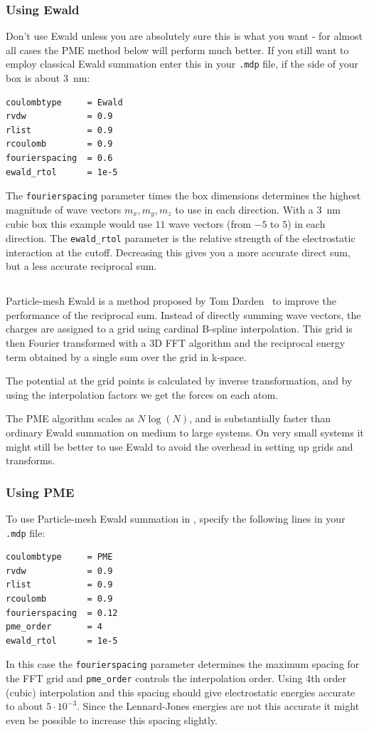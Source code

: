 \subsubsection{Using Ewald}
Don't use Ewald unless you are absolutely sure this is what you want -
for almost all cases the PME method below will perform much better.
If you still want to employ classical Ewald summation enter this in
your {\tt .mdp} file, if the side of your box is about $3$~nm:
\begin{verbatim}
coulombtype     = Ewald
rvdw            = 0.9
rlist           = 0.9
rcoulomb        = 0.9
fourierspacing  = 0.6
ewald_rtol      = 1e-5
\end{verbatim}
The {\tt fourierspacing} parameter times the box dimensions determines
the highest magnitude of wave vectors $m_x,m_y,m_z$ to use in each
direction. With a 3~nm cubic box this example would use $11$ wave vectors
(from $-5$ to $5$) in each direction.  The {\tt ewald\_rtol} parameter
is the relative strength of the electrostatic interaction at the
cutoff. Decreasing this gives you a more accurate direct sum, but a
less accurate reciprocal sum.
 
\subsection{}
\label{sec:pme}
Particle-mesh Ewald is a method proposed by Tom
Darden~\cite{Darden93,Essmann95} to improve the performance of the
reciprocal sum. Instead of directly summing wave vectors, the charges
are assigned to a grid using cardinal B-spline interpolation. This
grid is then Fourier transformed with a 3D FFT algorithm and the
reciprocal energy term obtained by a single sum over the grid in
k-space.

The potential at the grid points is calculated by inverse
transformation, and by using the interpolation factors we get the
forces on each atom. 

The PME algorithm scales as $N \log(N)$, and is substantially faster
than ordinary Ewald summation on medium to large systems. On very
small systems it might still be better to use Ewald to avoid the
overhead in setting up grids and transforms.

\subsubsection{Using PME}
To use Particle-mesh Ewald summation in {\gromacs}, specify the
following lines in your {\tt .mdp} file:
\begin{verbatim}
coulombtype     = PME
rvdw            = 0.9
rlist           = 0.9
rcoulomb        = 0.9
fourierspacing  = 0.12
pme_order       = 4
ewald_rtol      = 1e-5
\end{verbatim}
In this case the {\tt fourierspacing} parameter determines the maximum
spacing for the FFT grid and {\tt pme\_order} controls the
interpolation order. Using 4th order (cubic) interpolation and this
spacing should give electrostatic energies accurate to about
$5\cdot10^{-3}$. Since the Lennard-Jones energies are not this
accurate it might even be possible to increase this spacing slightly.

